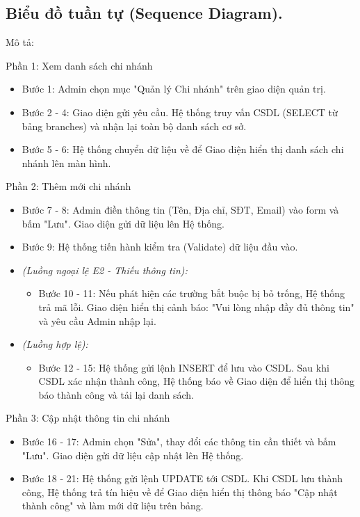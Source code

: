\documentclass[../BTL.tex]{subfiles}
\begin{document}
\subsection{Biểu đồ tuần tự (Sequence Diagram).}

Mô tả:

Phần 1: Xem danh sách chi nhánh

\begin{itemize}
\item
  Bước 1: Admin chọn mục "Quản lý Chi nhánh" trên giao diện quản trị.
\item
  Bước 2 - 4: Giao diện gửi yêu cầu. Hệ thống truy vấn CSDL (SELECT từ
  bảng branches) và nhận lại toàn bộ danh sách cơ sở.
\item
  Bước 5 - 6: Hệ thống chuyển dữ liệu về để Giao diện hiển thị danh sách
  chi nhánh lên màn hình.
\end{itemize}

Phần 2: Thêm mới chi nhánh

\begin{itemize}
\item
  Bước 7 - 8: Admin điền thông tin (Tên, Địa chỉ, SĐT, Email) vào form
  và bấm "Lưu". Giao diện gửi dữ liệu lên Hệ thống.
\item
  Bước 9: Hệ thống tiến hành kiểm tra (Validate) dữ liệu đầu vào.
\item
  \emph{(Luồng ngoại lệ E2 - Thiếu thông tin):}

  \begin{itemize}
  \item
    Bước 10 - 11: Nếu phát hiện các trường bắt buộc bị bỏ trống, Hệ
    thống trả mã lỗi. Giao diện hiển thị cảnh báo: "Vui lòng nhập đầy đủ
    thông tin" và yêu cầu Admin nhập lại.
  \end{itemize}
\item
  \emph{(Luồng hợp lệ):}

  \begin{itemize}
  \item
    Bước 12 - 15: Hệ thống gửi lệnh INSERT để lưu vào CSDL. Sau khi CSDL
    xác nhận thành công, Hệ thống báo về Giao diện để hiển thị thông báo
    thành công và tải lại danh sách.
  \end{itemize}
\end{itemize}

Phần 3: Cập nhật thông tin chi nhánh

\begin{itemize}
\item
  Bước 16 - 17: Admin chọn "Sửa", thay đổi các thông tin cần thiết và
  bấm "Lưu". Giao diện gửi dữ liệu cập nhật lên Hệ thống.
\item
  Bước 18 - 21: Hệ thống gửi lệnh UPDATE tới CSDL. Khi CSDL lưu thành
  công, Hệ thống trả tín hiệu về để Giao diện hiển thị thông báo "Cập
  nhật thành công" và làm mới dữ liệu trên bảng.
\end{itemize}
\end{document}
